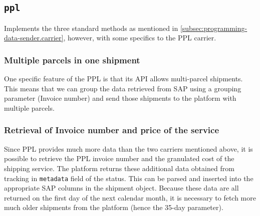 \subsection{\texttt{ppl}}
\label{subsec:programming-data-sender.carrier.ppl}

Implements the three standard methods as mentioned in \ref{subsec:programming-data-sender.carrier}, however, with some specifics to the PPL carrier.
\subsubsection{Multiple parcels in one shipment}
One specific feature of the PPL is that its API allows multi-parcel shipments. This means that we can group the data retrieved from SAP using a grouping parameter (Invoice number) and send those shipments to the platform with multiple parcels.

\subsubsection{Retrieval of Invoice number and price of the service}
Since PPL provides much more data than the two carriers mentioned above, it is possible to retrieve the PPL invoice number and the granulated cost of the shipping service. 
The platform returns these additional data obtained from tracking in \texttt{metadata} field of the status.
This can be parsed and inserted into the appropriate SAP columns in the shipment object.
Because these data are all returned on the first day of the next calendar month, it is necessary to fetch more much older shipments from the platform (hence the 35-day parameter).



